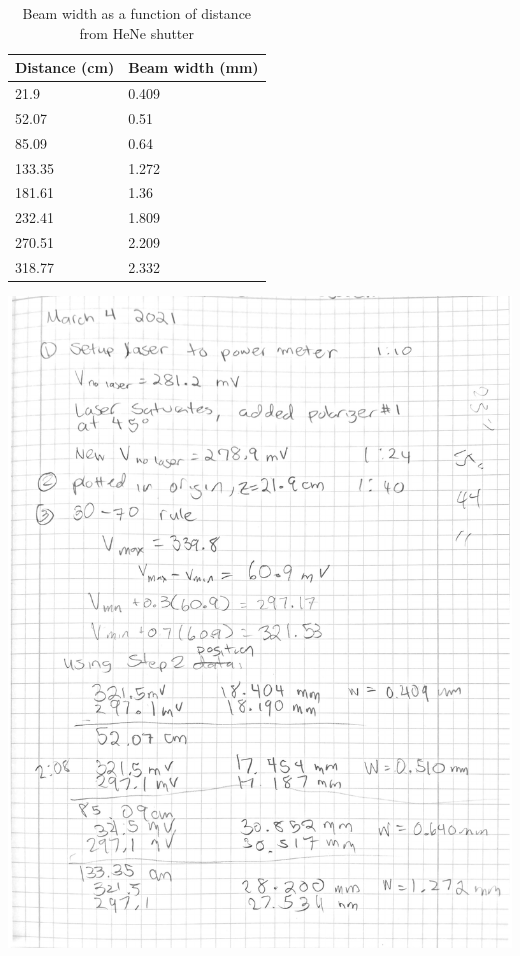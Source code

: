 \documentclass[notitlepage]{report}
\begin{document}
\begin{table}[H]
	\centering
	\caption{Beam width as a function of distance from HeNe shutter}
\begin{tabular}{@{}ll@{}}
	\toprule
	Distance (cm) & Beam width (mm) \\ \midrule
	21.9          & 0.409           \\
	52.07         & 0.51            \\
	85.09         & 0.64            \\
	133.35        & 1.272           \\
	181.61        & 1.36            \\
	232.41        & 1.809           \\
	270.51        & 2.209           \\
	318.77        & 2.332           \\ \bottomrule
\end{tabular}
\end{table}

	\includegraphics[scale=0.75,page=1]{scanned.pdf}
	
\end{document}
